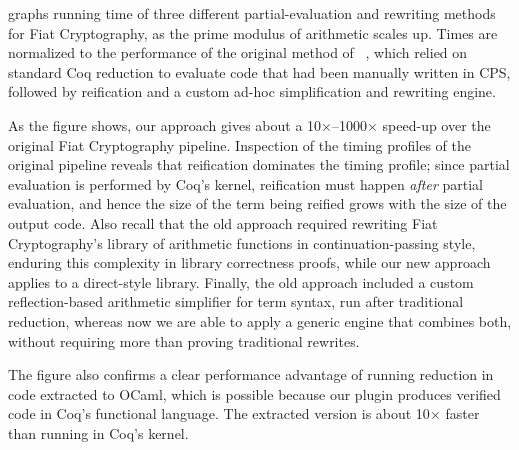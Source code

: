 \documentclass[sn-mathphys,pdflatex]{sn-jnl}%
\newcommand{\citetfield}[1]{\usebibentry{#1}{citet}~\cite{#1}}
\newcommand{\taccbv}{\texttt{cbv}}
\theoremstyle{thmstyleone}%
\theoremstyle{thmstyletwo}%
\theoremstyle{thmstylethree}%
\begin{document}
 graphs running time of three different partial-evaluation and rewriting methods for Fiat Cryptography, as the prime modulus of arithmetic scales up.
Times are normalized to the performance of the original method of \citetfield{FiatCryptoSP19}, which relied on standard Coq reduction to evaluate code that had been manually written in CPS, followed by reification and a custom ad-hoc simplification and rewriting engine.

As the figure shows, our approach gives about a 10$\times$--1000$\times$ speed-up over the original Fiat Cryptography pipeline.
Inspection of the timing profiles of the original pipeline reveals that reification dominates the timing profile; since partial evaluation is performed by Coq's kernel, reification must happen \emph{after} partial evaluation, and hence the size of the term being reified grows with the size of the output code.
Also recall that the old approach required rewriting Fiat Cryptography's library of arithmetic functions in continuation-passing style, enduring this complexity in library correctness proofs, while our new approach applies to a direct-style library.
Finally, the old approach included a custom reflection-based arithmetic simplifier for term syntax, run after traditional reduction, whereas now we are able to apply a generic engine that combines both, without requiring more than proving traditional rewrites.

The figure also confirms a clear performance advantage of running reduction in code extracted to OCaml, which is possible because our plugin produces verified code in Coq's functional language.
The extracted version is about 10$\times$ faster than running in Coq's kernel.
\end{document}
